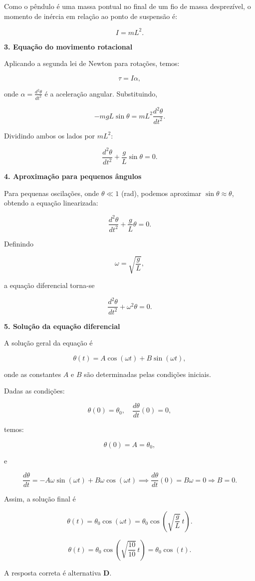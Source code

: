 \documentclass[a4paper,12pt]{article}
\begin{document}
\begin{flushleft}
Como o pêndulo é uma massa pontual no final de um fio de massa desprezível, o momento de inércia em relação ao ponto de suspensão é:

\[
\boxed{I = m L^2.}
\]

\bigskip

\textbf{3. Equação do movimento rotacional}

Aplicando a segunda lei de Newton para rotações, temos:

\[
\boxed{\tau = I \alpha,}
\]

onde \(\alpha = \frac{d^2 \theta}{dt^2}\) é a aceleração angular. Substituindo,

\[
- m g L \sin\theta = m L^2 \frac{d^2 \theta}{dt^2}.
\]

Dividindo ambos os lados por \(m L^2\):

\[
\boxed{\frac{d^2 \theta}{dt^2} + \frac{g}{L} \sin\theta = 0.}
\]

\bigskip

\textbf{4. Aproximação para pequenos ângulos}

Para pequenas oscilações, onde \(\theta \ll 1\) (rad), podemos aproximar \(\sin\theta \approx \theta\), obtendo a equação linearizada:

\[
\boxed{\frac{d^2 \theta}{dt^2} + \frac{g}{L} \theta = 0.}
\]

Definindo

\[
\omega = \sqrt{\frac{g}{L}},
\]

a equação diferencial torna-se

\[
\boxed{\frac{d^2 \theta}{dt^2} + \omega^2 \theta = 0.}
\]

\bigskip

\textbf{5. Solução da equação diferencial}

A solução geral da equação é

\[
\boxed{\theta(t) = A \cos(\omega t) + B \sin(\omega t),}
\]

onde as \colorbox{green!30}{constantes \(A\) e \(B\) são determinadas pelas condições iniciais.}

Dadas as condições:

\[
\theta(0) = \theta_0, \quad \frac{d\theta}{dt}(0) = 0,
\]

temos:

\[
\theta(0) = A = \theta_0,
\]

e

\[
\frac{d\theta}{dt} = - A \omega \sin(\omega t) + B \omega \cos(\omega t) \implies \frac{d\theta}{dt}(0) = B \omega = 0 \Rightarrow B = 0.
\]

Assim, a solução final é

\[
\theta(t) = \theta_0 \cos(\omega t) = \theta_0 \cos\left(\sqrt{\frac{g}{L}} \, t \right).
\]

\[
\boxed{
\theta(t) = \theta_0 \cos\left(\sqrt{\frac{10}{10}} \, t \right) = \theta_0 \cos\left(t \right).
}
\]

A resposta correta é alternativa \colorbox{green!50}{\textbf{D}}.
\end{flushleft}
\end{document}
